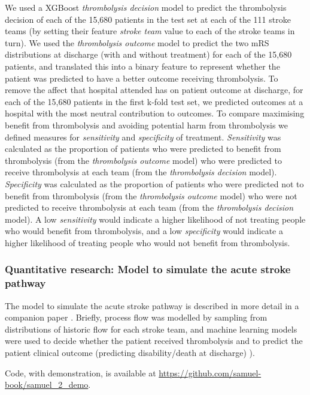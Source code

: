 We used a XGBoost \textit{thrombolysis decision} model to predict the thrombolysis decision of each of the 15,680 patients in the test set at each of the 111 stroke teams (by setting their feature \textit{stroke team} value to each of the stroke teams in turn). We used the \textit{thrombolysis outcome} model to predict the two mRS distributions at discharge (with and without treatment) for each of the 15,680 patients, and translated this into a binary feature to represent whether the patient was predicted to have a better outcome receiving thrombolysis. To remove the affect that hospital attended has on patient outcome at discharge, for each of the 15,680 patients in the first k-fold test set, we predicted outcomes at a hospital with the most neutral contribution to outcomes. To compare maximising benefit from thrombolysis and avoiding potential harm from thrombolysis we defined measures for \textit{sensitivity} and \textit{specificity} of treatment. \textit{Sensitivity} was calculated as the proportion of patients who were predicted to benefit from thrombolysis (from the \textit{thrombolysis outcome} model) who were predicted to receive thrombolysis at each team (from the \textit{thrombolysis decision} model). \textit{Specificity} was calculated as the proportion of patients who were predicted not to benefit from thrombolysis (from the \textit{thrombolysis outcome} model) who were not predicted to receive thrombolysis at each team (from the \textit{thrombolysis decision} model). A low \textit{sensitivity} would indicate a higher likelihood of not treating people who would benefit from thrombolysis, and a low \textit{specificity} would indicate a higher likelihood of treating people who would not benefit from thrombolysis.

\subsubsection{Quantitative research: Model to simulate the acute stroke pathway}

The model to simulate the acute stroke pathway is described in more detail in a companion paper \cite{pearn_are_2024}. Briefly, process flow was modelled by sampling from distributions of historic flow for each stroke team, and machine learning models were used to decide whether the patient received thrombolysis \cite{pearn_are_2024} and to predict the patient clinical outcome (predicting disability/death at discharge) \cite{pearn_are_2024}).

Code, with demonstration, is available at \url{https://github.com/samuel-book/samuel_2_demo}.

